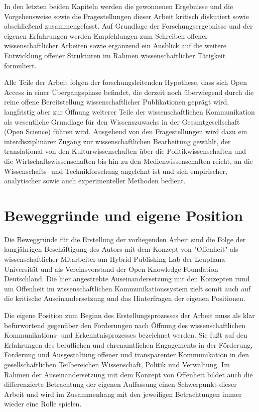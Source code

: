 In den letzten beiden Kapiteln werden die gewonnenen Ergebnisse und die Vorgehensweise sowie die Fragestellungen dieser Arbeit kritisch diskutiert sowie abschließend zusammengefasst. Auf Grundlage der Forschungsergebnisse und der eigenen Erfahrungen werden Empfehlungen zum Schreiben offener wissenschaftlicher Arbeiten sowie ergänzend ein Ausblick auf die weitere Entwicklung offener Strukturen im Rahmen wissenschaftlicher Tätigkeit formuliert.

Alle Teile der Arbeit folgen der forschungsleitenden Hypothese, dass sich Open Access in einer Übergangsphase befindet, die derzeit noch überwiegend durch die reine offene Bereitstellung wissenschaftlicher Publikationen geprägt wird, langfristig aber zur Öffnung weiterer Teile der wissenschaftlichen Kommunikation als wesentliche Grundlage für den Wissenszuwachs in der Gesamtgesellschaft (Open Science) führen wird. Ausgehend von den Fragestellungen wird dazu ein interdisziplinärer Zugang zur wissenschaftlichen Bearbeitung gewählt, der translational von den Kulturwissenschaften über die Politikwissenschaften und die Wirtschaftswissenschaften bis hin zu den Medienwissenschaften reicht, an die Wissenschafts- und Technikforschung angelehnt ist und sich empirischer, analytischer sowie auch experimenteller Methoden bedient.

\section{Beweggründe und eigene Position}

Die Beweggründe für die Erstellung der vorliegenden Arbeit sind die Folge der langjährigen Beschäftigung des Autors mit dem Konzept von "Offenheit" als wissenschaftlicher Mitarbeiter am Hybrid Publishing Lab der Leuphana Universität und als Vereinsvorstand der Open Knowledge Foundation Deutschland. Die hier angestrebte Auseinandersetzung mit den Konzepten rund um Offenheit im wissenschaftlichen Kommunikationssystem zielt somit auch auf die kritische Auseinandersetzung und das Hinterfragen der eigenen Positionen.

Die eigene Position zum Beginn des Erstellungsprozesses der Arbeit muss als klar befürwortend gegenüber den Forderungen nach Öffnung des wissenschaftlichen Kommunikations- und Erkenntnisprozesses bezeichnet werden. Sie fußt auf den Erfahrungen des beruflichen und ehrenamtlichen Engagements in der Förderung, Forderung und Ausgestaltung offener und transparenter Kommunikation in den gesellschaftlichen Teilbereichen Wissenschaft, Politik und Verwaltung. Im Rahmen der Auseinandersetzung mit dem Konzept von Offenheit bildet auch die differenzierte Betrachtung der eigenen Auffassung einen Schwerpunkt dieser Arbeit und wird im Zusammenhang mit den jeweiligen Betrachtungen immer wieder eine Rolle spielen.

